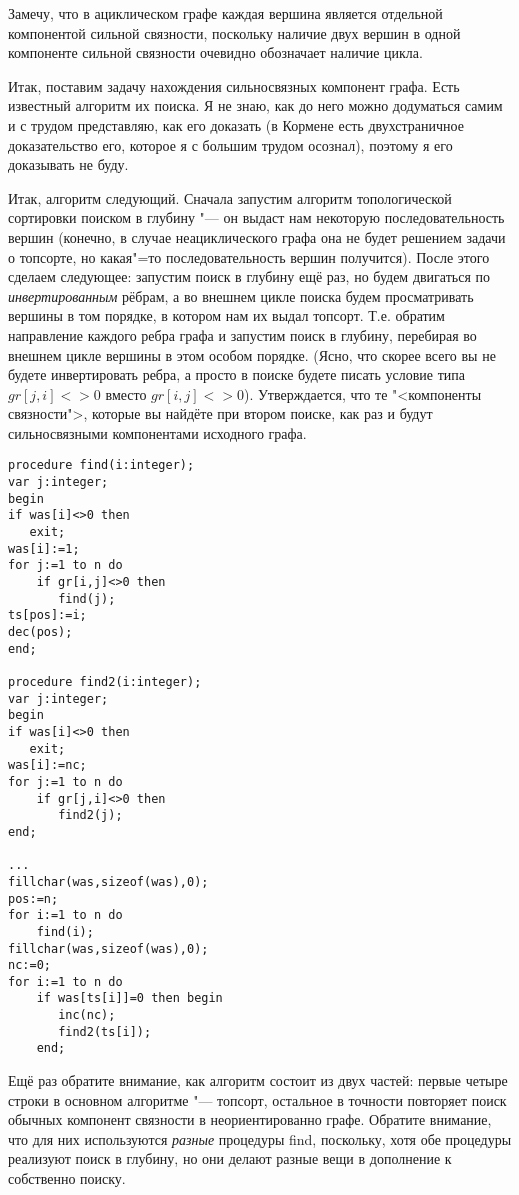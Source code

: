 Замечу, что в ациклическом графе каждая вершина является отдельной компонентой сильной связности, поскольку наличие двух
вершин в одной компоненте сильной связности очевидно обозначает наличие цикла.

Итак, поставим задачу нахождения сильносвязных компонент графа. Есть известный алгоритм их поиска. Я не знаю,
как до него можно додуматься самим и с трудом представляю, как его доказать (в Кормене есть двухстраничное 
доказательство его, которое я с большим трудом осознал), поэтому я его доказывать не буду.

Итак, алгоритм следующий. Сначала запустим алгоритм топологической сортировки поиском в глубину "--- он выдаст 
нам некоторую последовательность вершин (конечно, в случае неациклического графа она не будет решением задачи о топсорте, 
но какая"=то последовательность вершин получится). После этого сделаем следующее: запустим поиск в глубину ещё раз, но будем
двигаться по \textit{инвертированным} рёбрам, а во внешнем цикле поиска будем просматривать вершины в том порядке, 
в котором нам их выдал топсорт. Т.е. обратим направление каждого ребра графа и запустим поиск в глубину, перебирая 
во внешнем цикле вершины в этом особом порядке. (Ясно, что скорее всего вы не будете инвертировать ребра,
а просто в поиске будете писать условие типа $gr[j,i]<>0$ вместо $gr[i,j]<>0$). Утверждается, что те "<компоненты
связности">, которые вы найдёте при втором поиске, как раз и будут сильносвязными компонентами исходного графа.

\begin{codesamplec}{3}\begin{verbatim}
procedure find(i:integer);
var j:integer;
begin
if was[i]<>0 then
   exit;
was[i]:=1;
for j:=1 to n do
    if gr[i,j]<>0 then
       find(j);
ts[pos]:=i;
dec(pos);
end;

procedure find2(i:integer);
var j:integer;
begin
if was[i]<>0 then
   exit;
was[i]:=nc;
for j:=1 to n do
    if gr[j,i]<>0 then
       find2(j);
end;

...
fillchar(was,sizeof(was),0);
pos:=n;
for i:=1 to n do
    find(i);
fillchar(was,sizeof(was),0);
nc:=0;
for i:=1 to n do
    if was[ts[i]]=0 then begin
       inc(nc);
       find2(ts[i]);
    end;
\end{verbatim}
\end{codesamplec}

Ещё раз обратите внимание, как алгоритм состоит из двух частей: первые четыре строки в основном алгоритме "--- топсорт,
остальное в точности повторяет поиск обычных компонент связности в неориентированно графе. Обратите внимание, что для
них используются \textit{разные} процедуры find, поскольку, хотя обе процедуры реализуют поиск в глубину,
но они делают разные вещи в дополнение к собственно поиску. 

